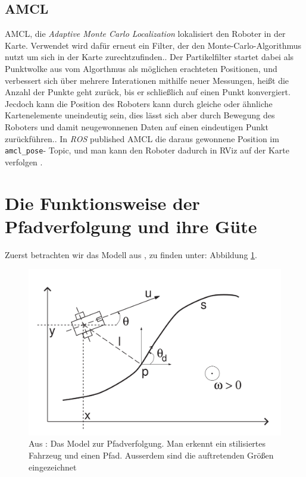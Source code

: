 \documentclass[11pt,a4paper]{article}
\begin{document}
\subsection*{AMCL}
AMCL, die \textit{Adaptive Monte Carlo Localization} lokalisiert den Roboter in der Karte. Verwendet wird dafür erneut ein 
Filter, der den Monte-Carlo-Algorithmus nutzt um sich in der Karte zurechtzufinden.\cite{website:oreillyamcl}. 
Der Partikelfilter startet dabei als Punktwolke aus vom Algorthmus als möglichen erachteten Positionen, und verbessert sich über mehrere Interationen mithilfe neuer Messungen, 
heißt die Anzahl der Punkte geht zurück, bis er schließlich auf einen Punkt konvergiert. 
Jecdoch kann die Position des Roboters kann durch gleiche oder ähnliche Kartenelemente uneindeutig sein, dies lässt sich aber durch Bewegung des Roboters und 
damit neugewonnenen Daten auf einen eindeutigen Punkt zurückführen.\cite{fox1999monte}. In \textit{ROS} published AMCL die daraus gewonnene Position im \verb+amcl_pose+-
Topic, und man kann den Roboter dadurch in RViz auf der Karte verfolgen \cite{website:amcl}.


\section{Die Funktionsweise der Pfadverfolgung und ihre Güte}

Zuerst betrachten wir das Modell aus \cite{INDIVERI2004185}, zu finden unter: Abbildung \ref{fig: ModelPfadverfolgung}.

\begin{figure}[ht]
  \centering
  \includegraphics[scale = 0.3]{model.png}
  \caption{Aus \cite{INDIVERI2004185}: Das Model zur Pfadverfolgung. Man erkennt ein stilisiertes Fahrzeug und einen Pfad. Ausserdem sind die auftretenden Größen eingezeichnet}
  \label{fig: ModelPfadverfolgung}
  \end{figure}
\end{document}
